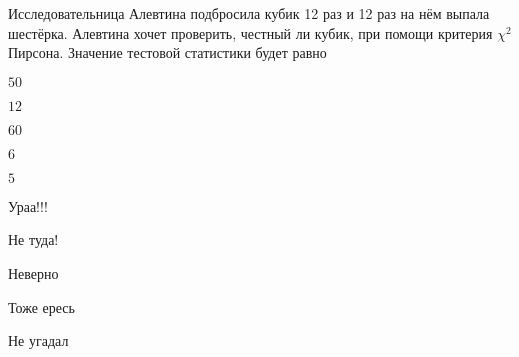 
\begin{question}
Исследовательница Алевтина подбросила кубик 12 раз и 12 раз на нём
выпала шестёрка. Алевтина хочет проверить, честный ли кубик, при помощи
критерия \(\chi^2\) Пирсона. Значение тестовой статистики будет равно
\begin{answerlist}
  \item \(50\)
  \item \(12\)
  \item \(60\)
  \item \(6\)
  \item \(5\)
\end{answerlist}
\end{question}

\begin{solution}
\begin{answerlist}
  \item Ураа!!!
  \item Не туда!
  \item Неверно
  \item Тоже ересь
  \item Не угадал
\end{answerlist}
\end{solution}

